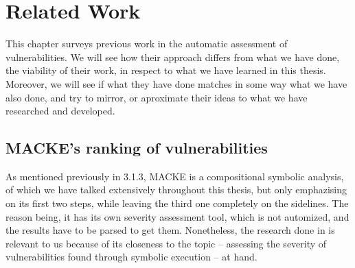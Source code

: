 
\chapter{Related Work}\label{chapter:Related Work}

This chapter surveys previous work in the automatic assessment of vulnerabilities. We will see how their approach differs from what we have done, the viability of their work, in respect to what we have learned in this thesis. Moreover, we will see if what they have done matches in some way what we have also done, and try to mirror, or aproximate their ideas to what we have researched and developed.

\section{MACKE's ranking of vulnerabilities}

As mentioned previously in 3.1.3, MACKE is a compositional symbolic analysis, of which we have talked extensively throughout this thesis, but only emphazising on its first two steps, while leaving the third one completely on the sidelines. The reason being, it has its own severity assessment tool, which is not automized, and the results have to be parsed to get them. Nonetheless, the research done in \parencite{ognawala} is relevant to us because of its closeness to the topic -- assessing the severity of vulnerabilities found through symbolic execution -- at hand.


